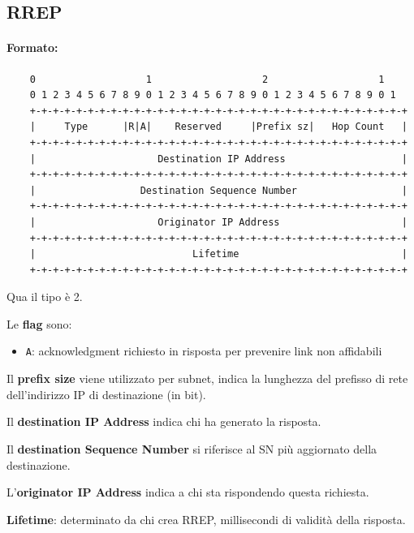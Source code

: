 \subsection{RREP}

\paragraph{Formato:} 
\begin{verbatim}
	0                   1                   2                   1
	0 1 2 3 4 5 6 7 8 9 0 1 2 3 4 5 6 7 8 9 0 1 2 3 4 5 6 7 8 9 0 1
	+-+-+-+-+-+-+-+-+-+-+-+-+-+-+-+-+-+-+-+-+-+-+-+-+-+-+-+-+-+-+-+-+
	|     Type      |R|A|    Reserved     |Prefix sz|   Hop Count   |
	+-+-+-+-+-+-+-+-+-+-+-+-+-+-+-+-+-+-+-+-+-+-+-+-+-+-+-+-+-+-+-+-+
	|                     Destination IP Address                    |
	+-+-+-+-+-+-+-+-+-+-+-+-+-+-+-+-+-+-+-+-+-+-+-+-+-+-+-+-+-+-+-+-+
	|                  Destination Sequence Number                  |
	+-+-+-+-+-+-+-+-+-+-+-+-+-+-+-+-+-+-+-+-+-+-+-+-+-+-+-+-+-+-+-+-+
	|                     Originator IP Address                     |
	+-+-+-+-+-+-+-+-+-+-+-+-+-+-+-+-+-+-+-+-+-+-+-+-+-+-+-+-+-+-+-+-+
	|                           Lifetime                            |
	+-+-+-+-+-+-+-+-+-+-+-+-+-+-+-+-+-+-+-+-+-+-+-+-+-+-+-+-+-+-+-+-+
\end{verbatim}
Qua il tipo è 2.

Le \textbf{flag} sono:
\begin{itemize}
	\item \texttt{A}: acknowledgment richiesto in risposta per prevenire link non affidabili
\end{itemize} 

Il \textbf{prefix size} viene utilizzato per subnet, indica la lunghezza del prefisso di rete dell'indirizzo IP di destinazione (in bit).

Il \textbf{destination IP Address} indica chi ha generato la risposta.

Il \textbf{destination Sequence Number} si riferisce al SN più aggiornato della destinazione.

L'\textbf{originator IP Address} indica a chi sta rispondendo questa richiesta.

\textbf{Lifetime}: determinato da chi crea RREP, millisecondi di validità della risposta.

